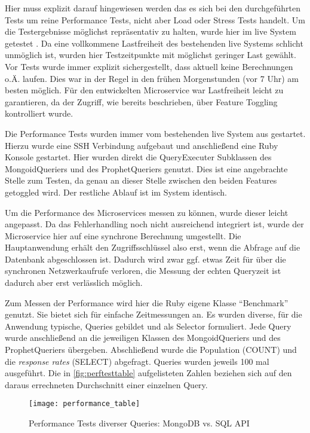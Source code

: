 Hier muss explizit darauf hingewiesen werden das es sich bei den durchgeführten Tests um reine Performance Tests, nicht aber Load oder Stress Tests handelt.
Um die Testergebnisse möglichst repräsentativ zu halten, wurde hier im live System getestet \cite{msdn:perftesting}.
Da eine vollkommene Lastfreiheit des bestehenden live Systems schlicht unmöglich ist, wurden hier Testzeitpunkte mit möglichst geringer Last gewählt. Vor Tests wurde immer explizit sichergestellt, dass aktuell keine Berechnungen o.Ä. laufen. Dies war in der Regel in den frühen Morgenstunden (vor 7 Uhr) am besten möglich.
Für den entwickelten Microservice war Lastfreiheit leicht zu garantieren, da der Zugriff, wie bereits beschrieben, über Feature Toggling kontrolliert wurde. 

Die Performance Tests wurden immer vom bestehenden live System aus gestartet. Hierzu wurde eine SSH Verbindung aufgebaut und anschließend eine Ruby Konsole gestartet. Hier wurden direkt die QueryExecuter Subklassen des MongoidQueriers und des ProphetQueriers genutzt. Dies ist eine angebrachte Stelle zum Testen, da genau an dieser Stelle zwischen den beiden Features getoggled wird. Der restliche Ablauf ist im System identisch.

Um die Performance des Microservices messen zu können, wurde dieser leicht angepasst. Da das Fehlerhandling noch nicht ausreichend integriert ist, wurde der Microservice hier auf eine synchrone Berechnung umgestellt. Die Hauptanwendung erhält den Zugriffsschlüssel also erst, wenn die Abfrage auf die Datenbank abgeschlossen ist. Dadurch wird zwar ggf. etwas Zeit für über die synchronen Netzwerkaufrufe verloren, die Messung der echten Queryzeit ist dadurch aber erst verlässlich möglich.

Zum Messen der Performance wird hier die Ruby eigene Klasse ``Benchmark'' genutzt. Sie bietet sich für einfache Zeitmessungen an. 
Es wurden diverse, für die Anwendung typische, Queries gebildet und als Selector formuliert. Jede Query wurde anschließend an die jeweiligen Klassen des MongoidQueriers und des ProphetQueriers übergeben. Abschließend wurde die Population (COUNT) und die \textit{response rates} (SELECT) abgefragt. Queries wurden jeweils 100 mal ausgeführt. Die in \autoref{fig:perftesttable} aufgelisteten Zahlen beziehen sich auf den daraus errechneten Durchschnitt einer einzelnen Query.

\begin{figure}[!ht]
    \centering
    \caption{Performance Tests diverser Queries: MongoDB vs. SQL API}
    \label{fig:perftesttable}
    \texttt{[image: performance\_table]}
\end{figure}

